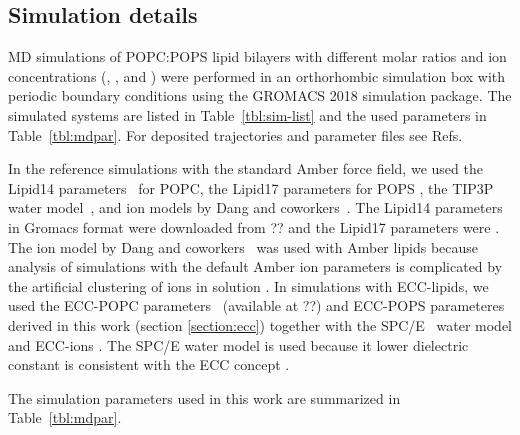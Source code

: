 \documentclass[journal=jpcbfk,manuscript=article]{achemso}
\begin{document}
\subsection{Simulation details} 

MD simulations of POPC:POPS lipid bilayers with different molar ratios 
and ion concentrations (, ,  and )
were performed in an orthorhombic simulation box with periodic boundary conditions
using the GROMACS 2018 \cite{Abraham15} simulation package. 
The simulated systems are listed in Table~\ref{tbl:sim-list} and the used parameters
in Table~\ref{tbl:mdpar}. 
For deposited trajectories and parameter files see 
Refs.~

In the reference simulations with the standard Amber force field,
we used the Lipid14 parameters~\cite{dickson14} for POPC, the Lipid17 parameters for POPS \cite{lipid17-future},
the TIP3P water model~\cite{jorgensen83}, and ion models by Dang and coworkers~\cite{smith94,chang1999,dang2006}.
The Lipid14 parameters in Gromacs format were downloaded from ??  and
the Lipid17 parameters were .
The ion model by Dang and coworkers~\cite{smith94,chang1999,dang2006} was used with Amber lipids because
analysis of simulations with the default Amber ion parameters is complicated by the artificial
clustering of ions in solution \cite{nmrlipids_proj4}.
In simulations with ECC-lipids,
we used the ECC-POPC parameters~\cite{melcr18} (available at ??) and ECC-POPS
parameteres derived in this work (section \ref{section:ecc}) together with the SPC/E~\cite{Berendsen1987}
water model and ECC-ions \cite{martinek17, kohagen16, Pluharova2014}.
The SPC/E water model is used because it lower dielectric constant is consistent with the
ECC concept \cite{leontyev11,leontyev14}.

The simulation parameters used in this work are summarized in Table~\ref{tbl:mdpar}. 
\end{document}
